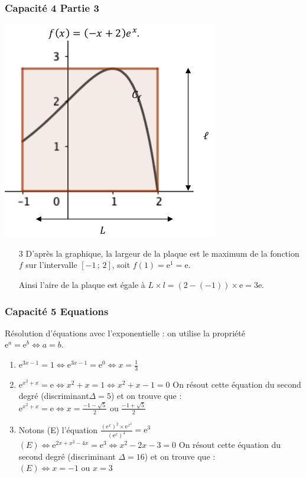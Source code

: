 \documentclass[11pt, hyperref={urlcolor=red,%
            linkcolor=blue, %
            colorlinks=true}]{beamer}
\newcommand{\Interff}[2]{\left[#1\, ;\, #2\right]}
\begin{document}
\begin{frame}
\frametitle{Capacité 4 Partie 3}

\begin{center}
\includegraphics[scale=0.3]{capacite4.png}
\end{center}

\begin{enumerate}

	
\item[3] D'après la graphique, la largeur de la plaque est le maximum de la fonction $f$ sur l'intervalle $\Interff{-1}{2}$, soit  $f(1)=\text{e}^{1}=\text{e}$.

Ainsi l'aire de la plaque est égale à $L \times l = (2 - (-1))\times \text{e}=3\text{e}$.
\end{enumerate}
\end{frame}

\begin{frame}
\frametitle{Capacité 5 Equations}
\label{capacite5}

Résolution d'équations avec l'exponentielle : on utilise la propriété $\text{e}^{a}=\text{e}^{b} \Leftrightarrow a = b$.

\begin{enumerate}

	\item $\text{e}^{3x-1}=1 \Leftrightarrow \text{e}^{3x-1}=\text{e}^{0} \Leftrightarrow x = \frac{1}{3} $
		\item $\text{e}^{x^{2}+x}=\text{e} \Leftrightarrow x^{2}+x = 1 \Leftrightarrow  x^2+x-1=0$
		On résout cette équation du second degré (discriminant$\Delta= 5$) et on trouve que :
		$\text{e}^{x^{2}+x}=\text{e} \Leftrightarrow \boxed{x = \frac{-1-\sqrt{5}}{2} \text{ ou }  \frac{-1+\sqrt{5}}{2}}   $
		\item  Notons (E) l'équation  $\frac{\left(\text{e}^{x}\right)^{2}\times \text{e}^{x^2}}{\left(\text{e}^{x}\right)^{4}}=\text{e}^{3}$
$(E) \Leftrightarrow \text{e}^{2x+x^{2}-4x}=\text{e}^{3} \Leftrightarrow x^{2}-2x-3=0$
On résout cette équation du second degré (discriminant $\Delta= 16$) et on trouve que :
$(E) \Leftrightarrow \boxed{x = -1 \text{ ou } x = 3  }$
\end{enumerate}
\end{frame}
\end{document}
